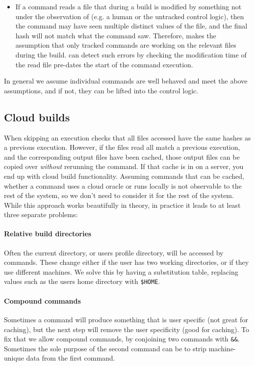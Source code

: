 \begin{itemize}
\item If a command reads a file that during a build is modified by something not under the observation of \Rattle (e.g. a human or the untracked control logic), then the command may have seen multiple distinct values of the file, and the final hash will not match what the command saw. Therefore, \Rattle makes the assumption that only \Rattle tracked commands are working on the relevant files during the build. \Rattle can detect such errors by checking the modification time of the read file pre-dates the start of the command execution.
\end{itemize}

In general we assume individual commands are well behaved and meet the above assumptions, and if not, they can be lifted into the control logic.

\subsection{Cloud builds}
\label{sec:cloud_builds}

When skipping an execution \Rattle checks that all files accessed have the same hashes as a previous execution. However, if the files read all match a previous execution, and the corresponding output files have been cached, those output files can be copied over \emph{without} rerunning the command. If that cache is in on a server, you end up with cloud build functionality. Assuming commands that can be cached, whether a command uses a cloud oracle or runs locally is not observable to the rest of the system, so we don't need to consider it for the rest of the system. While this approach works beautifully in theory, in practice it leads to at least three separate problems:

\paragraph{Relative build directories} Often the current directory, or users profile directory, will be accessed by commands. These change either if the user has two working directories, or if they use different machines. We solve this by having a substitution table, replacing values such as the users home directory with \texttt{\$HOME}.

\paragraph{Compound commands} Sometimes a command will produce something that is user specific (not great for caching), but the next step will remove the user specificity (good for caching). To fix that we allow compound commands, by conjoining two commands with \texttt{\&\&}. Sometimes the sole purpose of the second command can be to strip machine-unique data from the first command.

